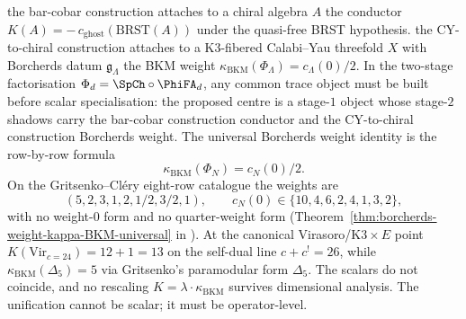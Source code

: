 the bar-cobar construction attaches to a chiral algebra $A$ the conductor
$K(A)=-\,c_{\mathrm{ghost}}(\mathrm{BRST}(A))$ under the quasi-free BRST
hypothesis. the CY-to-chiral construction attaches to a K$3$-fibered Calabi--Yau threefold
$X$ with Borcherds datum $\mathfrak{g}_\Lambda$ the BKM weight
$\kappa_{\mathrm{BKM}}(\Phi_\Lambda)=c_\Lambda(0)/2$. In the
two-stage factorisation $\Phi_d=\SpCh\circ\PhiFA_d$, any common trace
object must be built before scalar specialisation: the proposed centre is
a stage-$1$ object whose stage-$2$ shadows carry the bar-cobar construction conductor and
the CY-to-chiral construction Borcherds weight. The universal Borcherds weight identity is
the row-by-row formula
\[
 \kappa_{\mathrm{BKM}}(\Phi_N)=c_N(0)/2.
\]
On the Gritsenko--Cléry eight-row catalogue the weights are
\[
 (5,2,3,1,2,1/2,3/2,1),
 \qquad
 c_N(0)\in\{10,4,6,2,4,1,3,2\},
\]
with no weight-$0$ form and no quarter-weight form
(Theorem~\ref{thm:borcherds-weight-kappa-BKM-universal} in
\cite{VolI}). At the
canonical Virasoro/K$3 \times E$ point
$K(\mathrm{Vir}_{c=24}) = 12 + 1 = 13$ on the self-dual line
$c + c^! = 26$, while $\kappa_{\mathrm{BKM}}(\Delta_5) = 5$ via
Gritsenko's paramodular form $\Delta_5$. The scalars do not
coincide, and no rescaling $K = \lambda \cdot \kappa_{\mathrm{BKM}}$
survives dimensional analysis. The unification cannot be scalar;
it must be operator-level.


